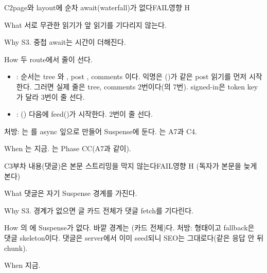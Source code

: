 \begin{checkitem}{\ckopen}{C2}{page와 layout에 순차 await(waterfall)가 없다}{FAIL\ckdot{}영향 H}
  \item[What] 서로 무관한 읽기가 앞 읽기를 기다리지 않는다.
  \item[Why] S3. 중첩 await는 시간이 더해진다.
  \item[How] 두 route에서 줄이 선다.
    \begin{itemize}[nosep]
      \item {}: 순서는 tree 와 , post , comments 이다. 익명은 ()가 같은  post 읽기를 먼저 시작한다. 그러면 실제 줄은 tree, comments 2번이다(의 7번). signed-in은 token key가 달라 3번이 줄 선다.
      \item {}: () 다음에 feed()가 시작한다. 2번이 줄 선다.
    \end{itemize}
    처방: 는 를 async 잎으로 만들어 Suspense에 둔다. \code{[slug]}는 A7과 C4.
  \item[When] 는 지금. \code{[slug]}는 Phase CC(A7과 같이).
\end{checkitem}

\begin{checkitem}{\ckopen}{C3}{부차 내용(댓글)은 본문 스트리밍을 막지 않는다}{FAIL\ckdot{}영향 H (독자가 본문을 늦게 본다)}
  \item[What] 댓글은 자기 Suspense 경계를 가진다.
  \item[Why] S3. 경계가 없으면 글 카드 전체가 댓글 fetch를 기다린다.
  \item[How] 의 에 Suspense가 없다. 바깥 경계는 (카드 전체)다. 처방:  형태이고 fallback은 댓글 skeleton이다. 댓글은 server에서 이미 seed되니 SEO는 그대로다(같은 응답 안 뒤 chunk).
  \item[When] 지금.
\end{checkitem}

